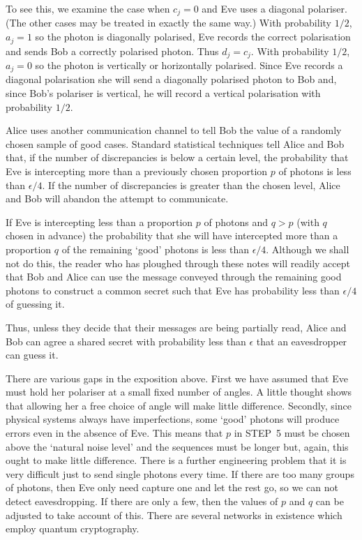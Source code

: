 \documentclass[12pt,a4paper]{article}
\theoremstyle{plain}
\theoremstyle{definition}
\begin{document}
    To see this, we examine the case when $c_{j}=0$ and
    Eve uses a diagonal polariser. (The other cases
    may be treated in exactly the same way.)
    With probability $1/2$, $a_{j}=1$ so the photon is diagonally
    polarised, Eve records the correct polarisation
    and sends Bob a correctly polarised photon. Thus $d_{j}=c_{j}$.
    With probability $1/2$, $a_{j}=0$ so the photon is vertically
    or horizontally polarised. Since Eve records a diagonal polarisation
    she will send a diagonally polarised photon to Bob
    and, since Bob's polariser is vertical, he will
    record a vertical polarisation
    with probability $1/2$.

     Alice uses another communication
    channel to tell Bob the value of a randomly chosen sample
    of good cases. Standard statistical techniques
    tell Alice and Bob that, if the number of discrepancies
    is below a certain level, the probability that
    Eve is intercepting more than a previously
    chosen proportion $p$
    of photons is less than $\epsilon/4$.
    If the number of discrepancies is greater than the
    chosen level, Alice and Bob will abandon
    the attempt to communicate.

     If Eve is intercepting less than a proportion $p$
    of photons and $q>p$ (with $q$ chosen in advance)
    the probability that she will have intercepted more than
    a proportion $q$ of the remaining `good' photons is less than $\epsilon/4$.
    Although we shall not do this, the reader who has
    ploughed through these notes will readily accept that
    Bob and Alice can use the message conveyed through the
    remaining good photons to construct
    a common secret such that Eve has probability
    less than $\epsilon/4$ of guessing
    it.

    Thus, unless they decide that their
    messages are being partially read,
    Alice and Bob can agree a shared secret
    with probability less than $\epsilon$ that
    an eavesdropper can guess it.

    There are various gaps in the exposition above.
    First we have assumed that Eve must hold her polariser
    at a small fixed number of angles. A little thought
    shows that allowing her a free choice of angle will make
    little difference. Secondly, since physical systems
    always have imperfections, some `good' photons
    will produce errors even in the absence of
    Eve. This means that $p$ in STEP~5 must
    be chosen above the `natural noise level'
    and the sequences must be longer but, again,
    this ought to make little difference.
    There is a further engineering problem that
    it is very difficult just to send single photons
    every time. If there are too many groups of photons,
    then Eve only need capture one and let the rest go,
    so we can not detect eavesdropping. If there are only a few,
    then the values of $p$ and $q$ can be adjusted to
    take account of this. There are several networks in existence
    which employ quantum cryptography.
\end{document}
